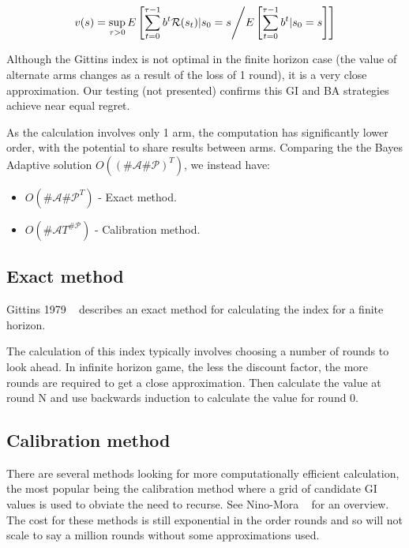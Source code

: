 \documentclass[11pt,a4,singlespacing,titlepagenumber=on]{scrreprt}
\numberwithin{equation}{chapter} %
\theoremstyle{remark}
\begin{document}
\begin{align}
v(s) = \sup_{\tau > 0} E\left[ \sum_{t=0}^{\tau-1} b^t \mathcal{R}(s_t) | s_0 = s  \middle/  E\left[ \sum_{t=0}^{\tau-1} b^t | s_0 = s \right]  \right]
\end{align}

Although the Gittins index is not optimal in the finite horizon case (the value of alternate arms changes as a result of the loss of 1 round), it is a very close approximation. Our testing (not presented) confirms this GI and BA strategies achieve near equal regret.

As the calculation involves only 1 arm, the computation has significantly lower order, with the potential to share results between arms. Comparing the the Bayes Adaptive solution $O((\#\mathcal{A} \#\mathcal{P})^T)$, we instead have:

\begin{itemize}
	\item $O(\#\mathcal{A} {\#\mathcal{P}}^T)$ - Exact method.
	\item $O(\#\mathcal{A} T^{\#\mathcal{P}})$ - Calibration method.
\end{itemize}

\subsection{ Exact method }

Gittins 1979 ~\cite{gittins1979bandit} describes an exact method for calculating the index for a finite horizon. 

The calculation of this index typically involves choosing a number of rounds to look ahead. In infinite horizon game, the less the discount factor, the more rounds are required to get a close approximation. Then calculate the value at round N and use backwards induction to calculate the value for round 0.

\subsection{ Calibration method }

There are several methods looking for more computationally efficient calculation, the most popular being the calibration method where a grid of candidate GI values is used to obviate the need to recurse. See Nino-Mora ~\cite{nino2011computing} for an overview. The cost for these methods is still exponential in the order rounds and so will not scale to say a million rounds without some approximations used.
\end{document}
